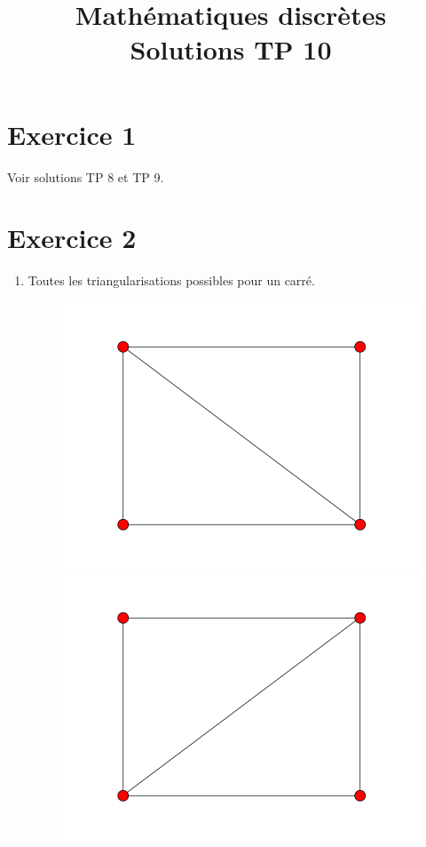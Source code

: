 \documentclass[fontsize=10pt]{article}
\title{\textbf{Mathématiques discrètes}\\ Solutions TP 10}
\date{}
\begin{document}
\maketitle

\section*{Exercice 1}
Voir solutions TP 8 et TP 9.

\section*{Exercice 2}
\begin{enumerate}
\item
Toutes les triangularisations possibles pour un carré.
\begin{figure}[hbtp]
\centering
\includegraphics[scale=0.1]{imgs/carre/carre_1.png}
\includegraphics[scale=0.1]{imgs/carre/carre_2.png}
\end{figure}


\end{enumerate}
\end{document}
